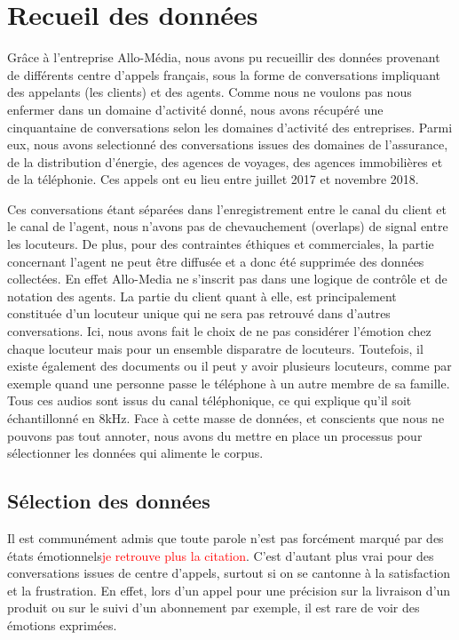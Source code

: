 \section{Recueil des données}
Grâce à l'entreprise Allo-Média, nous avons pu recueillir des données provenant de différents centre d'appels français, sous la forme de conversations impliquant des appelants (les clients) et des agents. Comme nous ne voulons pas nous enfermer dans un domaine d'activité donné, nous avons récupéré une cinquantaine de conversations selon les domaines d'activité des entreprises. Parmi eux, nous avons selectionné des conversations issues des domaines de l'assurance, de la distribution d'énergie, des agences de voyages, des agences immobilières et de la téléphonie. Ces appels ont eu lieu entre juillet 2017 et novembre 2018.

Ces conversations étant séparées dans l'enregistrement entre le canal du client et le canal de l'agent, nous n'avons pas de chevauchement (overlaps) de signal entre les locuteurs. De plus, pour des contraintes éthiques et commerciales, la partie concernant l'agent ne peut être diffusée et a donc été supprimée des données collectées. En effet Allo-Media ne s'inscrit pas dans une logique de contrôle et de notation des agents. La partie du client quant à elle, est principalement constituée d'un locuteur unique qui ne sera pas retrouvé dans d'autres conversations. Ici, nous avons fait le choix de ne pas considérer l'émotion chez chaque locuteur mais pour un ensemble disparatre de locuteurs. Toutefois, il existe également des documents ou il peut y avoir plusieurs locuteurs, comme par exemple quand une personne passe le téléphone à un autre membre de sa famille. Tous ces audios sont issus du canal téléphonique, ce qui explique qu'il soit échantillonné en 8kHz.
Face à cette masse de données, et conscients que nous ne pouvons pas tout annoter, nous avons du mettre en place un processus pour sélectionner les données qui alimente le corpus.

\subsection{Sélection des données}
Il est communément admis que toute parole n'est pas forcément marqué par des états émotionnels\textcolor{red}{je retrouve plus la citation}. C'est d'autant plus vrai pour des conversations issues de centre d'appels, surtout si on se cantonne à la satisfaction et la frustration. En effet, lors d'un appel pour une précision sur la livraison d'un produit ou sur le suivi d'un abonnement par exemple, il est rare de voir des émotions exprimées.

